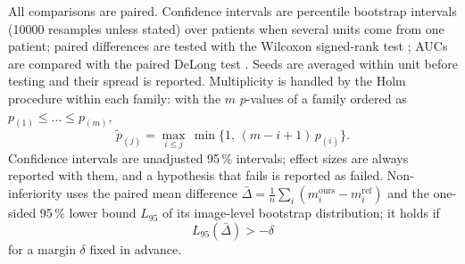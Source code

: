 All comparisons are paired. Confidence intervals are percentile bootstrap intervals \cite{efron1993bootstrap} (\num{10000} resamples unless
stated) over patients when several units come from one patient; paired differences are tested with the Wilcoxon signed-rank test
\cite{wilcoxon1945individual}; AUCs are compared with the paired DeLong test \cite{delong1988auc}. Seeds are averaged within unit before
testing and their spread is reported. Multiplicity is handled by the Holm procedure \cite{holm1979simple} within each family: with the $m$
$p$-values of a family ordered as $p_{(1)}\le\dots\le p_{(m)}$,
\begin{equation}
\tilde p_{(j)}=\max_{i\le j}\,\min\big\{1,\,(m-i+1)\,p_{(i)}\big\}.
\label{eq:holm}
\end{equation}
Confidence intervals are unadjusted 95\,\% intervals; effect sizes are always reported with them, and a hypothesis that fails is reported as
failed. Non-inferiority uses the paired mean difference $\bar\Delta=\frac1n\sum_i(m_i^{\mathrm{ours}}-m_i^{\mathrm{ref}})$ and the
one-sided 95\,\% lower bound $L_{95}$ of its image-level bootstrap distribution; it holds if
\begin{equation}
L_{95}(\bar\Delta)>-\delta
\label{eq:ni}
\end{equation}
for a margin $\delta$ fixed in advance.

